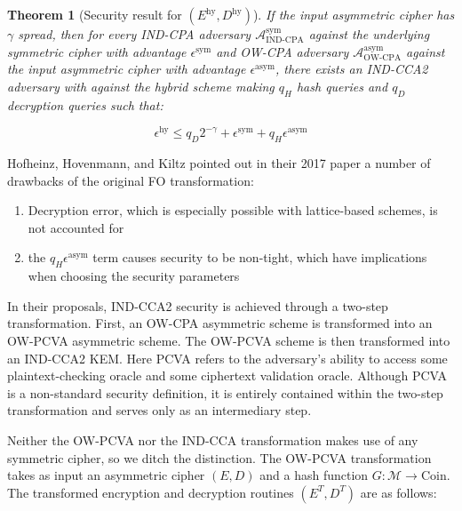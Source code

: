 \documentclass{article}
\newtheorem{theorem}{Theorem}[section]
\begin{document}
\begin{theorem}[Security result for $(E^\text{hy}, D^\text{hy})$]\label{fo-1999-theorem}
    If the input asymmetric cipher has $\gamma$ spread, then for every IND-CPA adversary $\mathcal{A}^\text{sym}_\text{IND-CPA}$ against the underlying symmetric cipher with advantage $\epsilon^\text{sym}$ and OW-CPA adversary $\mathcal{A}^\text{asym}_\text{OW-CPA}$ against the input asymmetric cipher with advantage $\epsilon^\text{asym}$, there exists an IND-CCA2 adversary with against the hybrid scheme making $q_H$ hash queries and $q_D$ decryption queries such that:

    \begin{equation*}
        \epsilon^\text{hy} 
        \leq q_D2^{-\gamma} 
            + \epsilon^\text{sym} 
            + q_H\epsilon^\text{asym}
    \end{equation*}
\end{theorem}

Hofheinz, Hovenmann, and Kiltz pointed out in their 2017 paper a number of drawbacks of the original FO transformation:

\begin{enumerate}
    \item Decryption error, which is especially possible with lattice-based schemes, is not accounted for
    \item the $q_H\epsilon^\text{asym}$ term causes security to be non-tight, which have implications when choosing the security parameters
\end{enumerate}

In their proposals, IND-CCA2 security is achieved through a two-step transformation. First, an OW-CPA asymmetric scheme is transformed into an OW-PCVA asymmetric scheme. The OW-PCVA scheme is then transformed into an IND-CCA2 KEM. Here PCVA refers to the adversary's ability to access some plaintext-checking oracle and some ciphertext validation oracle. Although PCVA is a non-standard security definition, it is entirely contained within the two-step transformation and serves only as an intermediary step.

Neither the OW-PCVA nor the IND-CCA transformation makes use of any symmetric cipher, so we ditch the distinction. The OW-PCVA transformation takes as input an asymmetric cipher $(E, D)$ and a hash function $G: \mathcal{M} \rightarrow \text{Coin}$. The transformed encryption and decryption routines $(E^T, D^T)$ are as follows:
\end{document}
